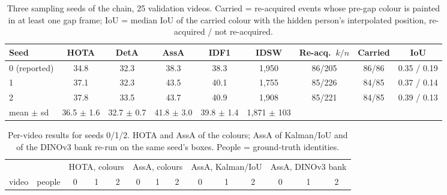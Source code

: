 \documentclass{article} %
\newcommand{\rev}[1]{#1}
\begin{document}
\begin{table}[h]
\caption{\rev{Three sampling seeds of the chain, 25 validation videos. Carried = re-acquired
events whose pre-gap colour is painted in at least one gap frame; IoU = median IoU of the
carried colour with the hidden person's interpolated position, re-acquired / not
re-acquired.}}
\label{tab:seeds}
\begin{center}
\scriptsize
\setlength{\tabcolsep}{3pt}
\begin{tabular}{lcccccccc}
\toprule
\rev{Seed} & \rev{HOTA} & \rev{DetA} & \rev{AssA} & \rev{IDF1} & \rev{IDSW} & \rev{Re-acq.\ $k/n$} & \rev{Carried} & \rev{IoU} \\
\midrule
\rev{0 (reported)} & \rev{34.8} & \rev{32.3} & \rev{38.3} & \rev{38.3} & \rev{1,950} & \rev{86/205} & \rev{86/86} & \rev{0.35 / 0.19} \\
\rev{1} & \rev{37.1} & \rev{32.3} & \rev{43.5} & \rev{40.1} & \rev{1,755} & \rev{85/226} & \rev{84/85} & \rev{0.37 / 0.14} \\
\rev{2} & \rev{37.8} & \rev{33.5} & \rev{43.7} & \rev{40.9} & \rev{1,908} & \rev{85/221} & \rev{84/85} & \rev{0.39 / 0.13} \\
\midrule
\rev{mean $\pm$ sd} & \rev{36.5 $\pm$ 1.6} & \rev{32.7 $\pm$ 0.7} & \rev{41.8 $\pm$ 3.0} & \rev{39.8 $\pm$ 1.4} & \rev{1,871 $\pm$ 103} & & & \\
\bottomrule
\end{tabular}
\end{center}
\end{table}

\begin{table}[h]
\caption{\rev{Per-video results for seeds 0/1/2. HOTA and AssA of the colours; AssA of
Kalman/IoU and of the DINOv3 bank re-run on the same seed's boxes. People = ground-truth
identities.}}
\label{tab:seedsvideo}
\begin{center}
\scriptsize
\setlength{\tabcolsep}{2.5pt}
\begin{tabular}{lc|ccc|ccc|ccc|ccc}
\toprule
 & & \multicolumn{3}{c|}{\rev{HOTA, colours}} & \multicolumn{3}{c|}{\rev{AssA, colours}} & \multicolumn{3}{c|}{\rev{AssA, Kalman/IoU}} & \multicolumn{3}{c}{\rev{AssA, DINOv3 bank}} \\
\rev{video} & \rev{people} & 0 & 1 & 2 & 0 & 1 & 2 & 0 & 1 & 2 & 0 & 1 & 2 \\
\midrule

\end{tabular}
\end{center}
\end{table}
\end{document}
